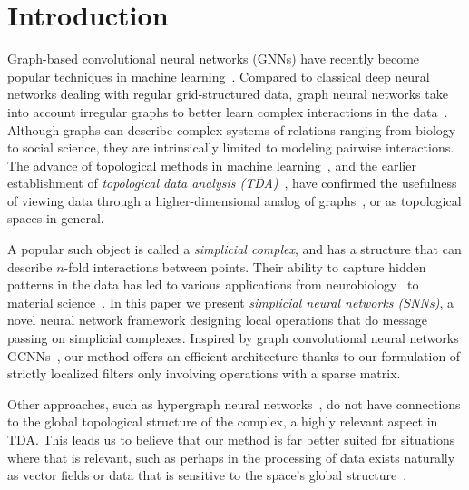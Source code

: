 \section{Introduction}

Graph-based convolutional neural networks (GNNs) have recently become popular techniques in machine learning~\cite{defferrard2016convolutional, bronstein2017geometric, wu2020survey}. Compared to classical deep neural networks dealing with regular grid-structured data, graph neural networks take into account irregular graphs to better learn complex interactions in the data~\cite{battaglia2018relational}. Although graphs can describe complex systems of relations ranging from biology to social science, they are intrinsically limited to modeling pairwise interactions. The advance of topological methods in machine learning~\cite{Gabrielsson2020topological, Hofer2019LearningRO, rieck2018neural}, and the earlier establishment of \emph{topological data analysis (TDA)}~\cite{carlsson2008,chazal2017,edelsbrunner2010computational,ghrist2008barcodes}, have confirmed the usefulness of viewing data through a higher-dimensional analog of graphs~\cite{moore2012,patania2017}, or as topological spaces in general. 

A popular such object is called a \emph{simplicial complex}, and has a structure that can describe $n$-fold interactions between points. Their ability to capture hidden patterns in the data has led to various applications from neurobiology~\cite{giusti2015,reimann2017} to material science~\cite{hiraoka2016}. In this paper we present \textit{simplicial neural networks (SNNs)}, a novel neural network framework designing local operations that do message passing on simplicial complexes.
Inspired by graph convolutional neural networks GCNNs~\cite{defferrard2016convolutional}, our method offers an efficient architecture thanks to our formulation of strictly localized filters only involving operations with a sparse matrix.

Other approaches, such as hypergraph neural networks~\cite{feng2018hypergraphs}, do not have connections to the global topological structure of the complex, a highly relevant aspect in TDA. This leads us to believe that our method is far better suited for situations where that is relevant, such as perhaps in the processing of data exists naturally as vector fields or data that is sensitive to the space's global structure~\cite{perraudin2019deepsphere}.

